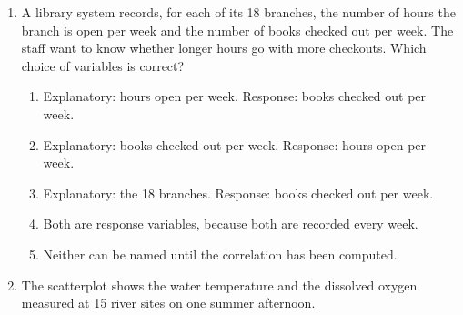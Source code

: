 \documentclass[12pt]{article}
\begin{document}
\begin{enumerate}[leftmargin=1.9em, itemsep=0.13in]
  \boxguard[9]%
  \item A library system records, for each of its 18 branches, the number of hours the branch
        is open per week and the number of books checked out per week. The staff want to know
        whether longer hours go with more checkouts. Which choice of variables is correct?
        \begin{enumerate}[label=\textbf{(\Alph*)}, leftmargin=2.2em, itemsep=2pt]
          \item Explanatory: hours open per week. Response: books checked out per week.
          \item Explanatory: books checked out per week. Response: hours open per week.
          \item Explanatory: the 18 branches. Response: books checked out per week.
          \item Both are response variables, because both are recorded every week.
          \item Neither can be named until the correlation has been computed.\hfill{}\rule[-0.2in]{0pt}{0.48in}
        \end{enumerate}

  \boxguard[18]%
  \item The scatterplot shows the water temperature and the dissolved oxygen measured at 15
        river sites on one summer afternoon.

        \vspace{4pt}
        {\centering
        \par}
        \vspace{2pt}


\end{enumerate}
\end{document}

